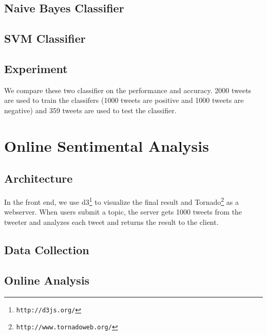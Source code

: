 \documentclass{article}
\begin{document}
\subsection{Naive Bayes Classifier}
\subsection{SVM Classifier}
\subsection{Experiment}
We compare these two classifier on the performance and accuracy. 2000 tweets are used to train the classifers (1000 tweets are positive and 1000 tweets are negative) and 359 tweets are used to test the classifier.
\section{Online Sentimental Analysis}
\subsection{Architecture}
In the front end, we use d3\footnote{\texttt{\scriptsize{http://d3js.org/‎‎}}} to visualize the final result and Tornado\footnote{\texttt{\scriptsize{http://www.tornadoweb.org/}}} as a webserver. When users submit a topic, the server gets 1000 tweets from the tweeter and analyzes each tweet and returns the result to the client. 
\subsection{Data Collection}

\subsection{Online Analysis}
\end{document}
